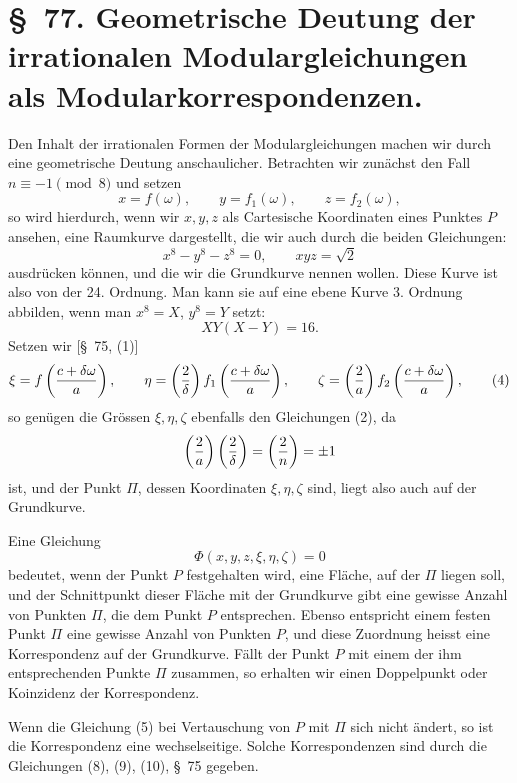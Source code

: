 \documentclass[11pt]{article}
\begin{document}
\section*{\S~77. Geometrische Deutung der irrationalen Modulargleichungen als Modularkorrespondenzen.}

Den Inhalt der irrationalen Formen der Modulargleichungen machen wir durch eine geometrische Deutung anschaulicher. Betrachten wir zunächst den Fall $n\equiv -1\pmod 8$ und setzen
\begin{equation}
 x=f(\omega),\qquad y=f_1(\omega),\qquad z=f_2(\omega),
\tag{1}
\end{equation}
so wird hierdurch, wenn wir $x,y,z$ als Cartesische Koordinaten eines Punktes $P$ ansehen, eine Raumkurve dargestellt, die wir auch durch die beiden Gleichungen:
\begin{equation}
 x^8-y^8-z^8=0,
 \qquad
 xyz=\sqrt{2}
\tag{2}
\end{equation}
ausdrücken können, und die wir die Grundkurve nennen wollen. Diese Kurve ist also von der 24. Ordnung. Man kann sie auf eine ebene Kurve 3. Ordnung abbilden, wenn man $x^8=X$, $y^8=Y$ setzt:
\begin{equation}
 XY(X-Y)=16.
\tag{3}
\end{equation}
Setzen wir [\S~75, (1)]
\begin{equation}
 \xi=f\left({c+\delta\omega\over a}\right),\qquad
 \eta=\left({2\over\delta}\right)f_1\left({c+\delta\omega\over a}\right),\qquad
 \zeta=\left({2\over a}\right)f_2\left({c+\delta\omega\over a}\right),
\tag{4}
\end{equation}
so genügen die Grössen $\xi,\eta,\zeta$ ebenfalls den Gleichungen (2), da
\[
 \left({2\over a}\right)\left({2\over\delta}\right)=\left({2\over n}\right)=\pm1
\]
ist, und der Punkt $\Pi$, dessen Koordinaten $\xi,\eta,\zeta$ sind, liegt also auch auf der Grundkurve.

Eine Gleichung
\[
 \Phi(x,y,z,\xi,\eta,\zeta)=0
\]
bedeutet, wenn der Punkt $P$ festgehalten wird, eine Fläche, auf der $\Pi$ liegen soll, und der Schnittpunkt dieser Fläche mit der Grundkurve gibt eine gewisse Anzahl von Punkten $\Pi$, die dem Punkt $P$ entsprechen. Ebenso entspricht einem festen Punkt $\Pi$ eine gewisse Anzahl von Punkten $P$, und diese Zuordnung heisst eine Korrespondenz auf der Grundkurve. Fällt der Punkt $P$ mit einem der ihm entsprechenden Punkte $\Pi$ zusammen, so erhalten wir einen Doppelpunkt oder Koinzidenz der Korrespondenz.

Wenn die Gleichung (5) bei Vertauschung von $P$ mit $\Pi$ sich nicht ändert, so ist die Korrespondenz eine wechselseitige. Solche Korrespondenzen sind durch die Gleichungen (8), (9), (10), \S~75 gegeben.
\end{document}
